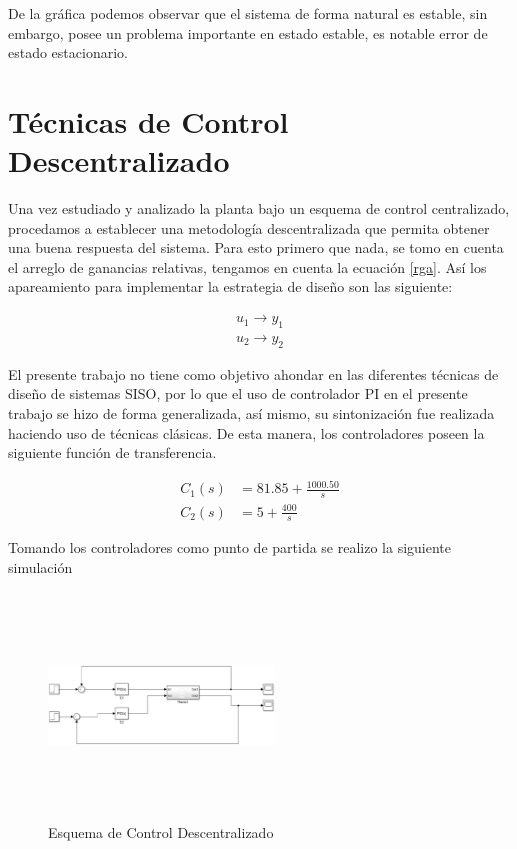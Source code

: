 \documentclass[journal,twoside,web]{ieeecolor}
\begin{document}
	De la gráfica podemos observar que el sistema de forma natural es estable, sin embargo, posee un problema importante en estado estable, es notable error de estado estacionario.


\section{Técnicas de Control Descentralizado}

	Una vez estudiado y analizado la planta bajo un esquema de control centralizado, procedamos a establecer una metodología descentralizada que permita obtener una buena respuesta del sistema. Para esto primero que nada, se tomo en cuenta el arreglo de ganancias relativas, tengamos en cuenta la ecuación \eqref{rga}. Así los apareamiento para implementar la estrategia de diseño son las siguiente:
	
	\begin{equation}
		\begin{aligned}
			u_1 \longrightarrow y_1 \\
			u_2 \longrightarrow y_2
		\end{aligned}
	\end{equation}
	
	El presente trabajo no tiene como objetivo ahondar en las diferentes técnicas de diseño de sistemas SISO, por lo que el uso de controlador PI en el presente trabajo se hizo de forma generalizada, así mismo, su sintonización fue realizada haciendo uso de técnicas clásicas. De esta manera, los controladores poseen la siguiente función de transferencia.
	
	\begin{equation}
		\begin{aligned}
			C_1(s) &= 81.85 + \frac{1000.50}{s} \\
			C_2(s) &= 5 + \frac{400}{s}
		\end{aligned}
	\end{equation}
	
	Tomando los controladores como punto de partida se realizo la siguiente simulación
	
	\begin{figure}[h]
		\begin{center}
			\includegraphics[width=6cm,height=6cm,keepaspectratio]{descentralizado}
			\caption{ Esquema de Control Descentralizado \label{descentralizado}}
		\end{center}
	\end{figure}
	
\end{document}
